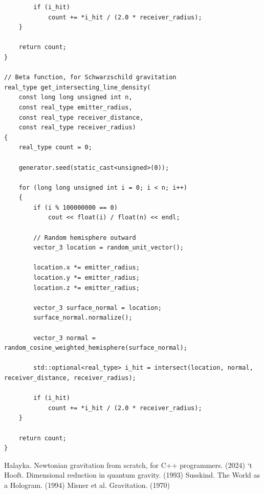 \documentclass[12pt]{article}
\begin{document}
\begin{lstlisting}
		if (i_hit)
			count += *i_hit / (2.0 * receiver_radius);
	}

	return count;
}

// Beta function, for Schwarzschild gravitation
real_type get_intersecting_line_density(
	const long long unsigned int n,
	const real_type emitter_radius,
	const real_type receiver_distance,
	const real_type receiver_radius)
{
	real_type count = 0;

	generator.seed(static_cast<unsigned>(0));

	for (long long unsigned int i = 0; i < n; i++)
	{
		if (i % 100000000 == 0)
			cout << float(i) / float(n) << endl;

		// Random hemisphere outward
		vector_3 location = random_unit_vector();

		location.x *= emitter_radius;
		location.y *= emitter_radius;
		location.z *= emitter_radius;

		vector_3 surface_normal = location;
		surface_normal.normalize();

		vector_3 normal = random_cosine_weighted_hemisphere(surface_normal);

		std::optional<real_type> i_hit = intersect(location, normal, receiver_distance, receiver_radius);

		if (i_hit)
			count += *i_hit / (2.0 * receiver_radius);
	}

	return count;
}

\end{lstlisting}















\begin{thebibliography}{9}


 Halayka. Newtonian gravitation from scratch, for C++ programmers. (2024)
 `t Hooft. Dimensional reduction in quantum gravity. (1993)
 Susskind. The World as a Hologram. (1994)
 Misner et al. Gravitation. (1970)

\end{thebibliography}


\pagebreak
\end{document}

